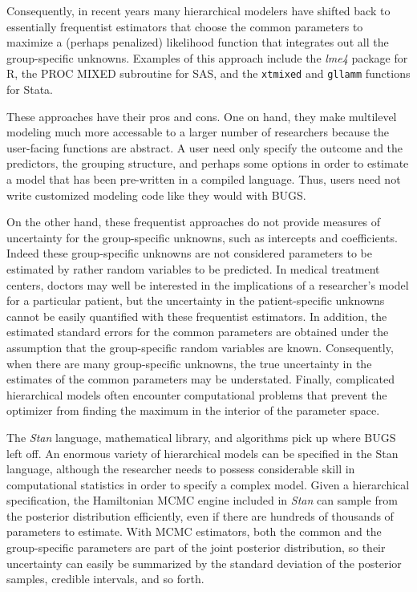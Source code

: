 \documentclass[11pt,notitlepage]{article}
\begin{document}
Consequently, in recent years many hierarchical modelers have shifted back to essentially
frequentist estimators that choose the common parameters to maximize a (perhaps penalized) 
likelihood function that integrates out all the group-specific unknowns. Examples of this
approach include the \textit{lme4} package for R, the PROC MIXED subroutine for SAS, and
the \texttt{xtmixed} and \texttt{gllamm} functions for Stata. 

These approaches have their pros and cons. One on hand, they make multilevel modeling much more accessable to a larger number
of researchers because the user-facing functions are abstract. A user need only specify the
outcome and the predictors, the grouping structure, and perhaps some options in order to estimate
a model that has been pre-written in a compiled language. Thus, users need not write customized 
modeling code like they would with BUGS.

On the other hand, these frequentist approaches do not provide measures of uncertainty for the
group-specific unknowns, such as intercepts and coefficients. Indeed these group-specific
unknowns are not considered parameters to be estimated by rather random variables to be
predicted. In medical treatment centers, doctors may well be interested in the implications
of a researcher's model for a particular patient, but the uncertainty in the patient-specific
unknowns cannot be easily quantified with these frequentist estimators. In addition, the 
estimated standard errors for the common parameters are obtained under the assumption that
the group-specific random variables are known. Consequently, when there are many group-specific
unknowns, the true uncertainty in the estimates of the common parameters may be understated. 
Finally, complicated hierarchical models often encounter computational problems that prevent
the optimizer from finding the maximum in the interior of the parameter space.

The \textit{Stan} language, mathematical library, and algorithms pick up where BUGS left off.
An enormous variety of hierarchical models can be specified in the Stan language, although the
researcher needs to possess considerable skill in computational statistics in order to specify
a complex model. Given a hierarchical specification, the Hamiltonian MCMC engine included in \textit{Stan}
can sample from the posterior distribution efficiently, even if there are hundreds of thousands
of parameters to estimate. With MCMC estimators, both the common and the group-specific parameters
are part of the joint posterior distribution, so their uncertainty can easily be summarized by
the standard deviation of the posterior samples, credible intervals, and so forth.
\end{document}
